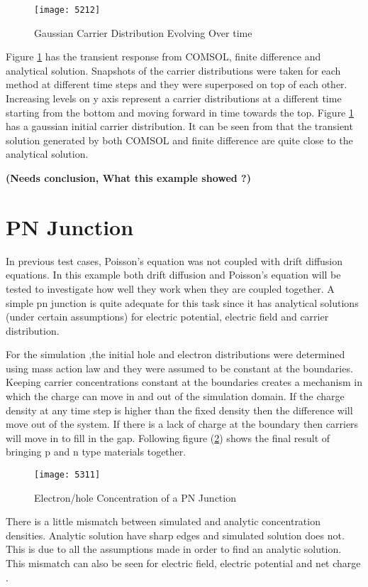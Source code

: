 \begin{figure}[ht]
\centering
\texttt{[image: 5212]}
\caption{Gaussian Carrier Distribution Evolving Over time} 
\label{51}
\end{figure}

Figure \ref{51} has the transient response from COMSOL, finite difference and analytical solution. Snapshots of the carrier distributions were taken for each method at different time steps and they were superposed on top of each other. Increasing levels on y axis represent a carrier distributions at a different time starting from the bottom and moving forward in time towards the top. Figure \ref{51} has a gaussian initial carrier distribution. It can be seen from that the transient solution generated by both COMSOL and finite difference are quite close to the analytical solution.

\textbf{(Needs conclusion, What this example showed ?)}

\clearpage
\section{PN Junction}
In previous test cases, Poisson's equation was not coupled with drift diffusion equations. In this example both drift diffusion and Poisson's equation will be tested to investigate how well they work when they are coupled together. A simple pn junction is quite adequate for this task since it has analytical solutions (under certain assumptions) for electric potential, electric field and carrier distribution.

For the simulation ,the initial hole and electron distributions were determined using mass action law and they were assumed to be constant at the boundaries. Keeping carrier concentrations constant at the boundaries creates a mechanism in which the charge can move in and out of the simulation domain. If the charge density at any time step is higher than the fixed density then the difference will move out of the system. If there is a lack of charge at the boundary then carriers will move in to fill in the gap. Following figure (\ref{npcon}) shows the final result of bringing p and n type materials together. 
 
\begin{figure}[ht]
\centering
\texttt{[image: 5311]}
\caption{Electron/hole Concentration of a PN Junction} 
\label{npcon}
\end{figure}

There is a little mismatch between simulated and analytic concentration densities. Analytic solution have sharp edges and simulated solution does not. This is due to all the assumptions made in order to find an analytic solution. This mismatch can also be seen for electric field, electric potential and net charge .

